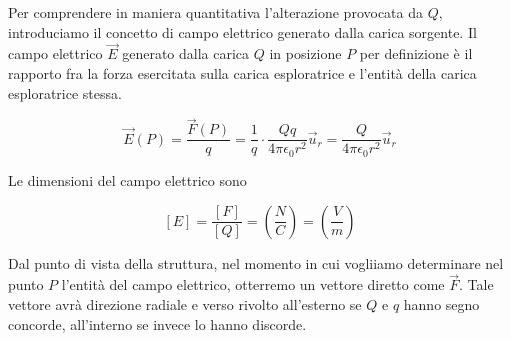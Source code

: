 Per comprendere in maniera quantitativa l'alterazione provocata da $Q$, introduciamo il concetto di campo elettrico generato dalla carica sorgente.
Il campo elettrico $\vec{E} $ generato dalla carica $Q$ in posizione $P$ per definizione è il rapporto fra la forza esercitata sulla carica esploratrice e l'entità della carica esploratrice stessa.

\[
	\vec{E} (P)=\frac{\vec{F} (P)}{q}=\frac{1}{q}\cdot \frac{Qq}{4\pi \epsilon_0 r^2}\vec{u}_r = \frac{Q}{4\pi \epsilon_0 r^2}\vec{u}_r
\]

Le dimensioni del campo elettrico sono

\[
	[E]=\frac{[F]}{[Q]} = \left( \frac{N}{C} \right) = \left( \frac{V}{m} \right)
\]

Dal punto di vista della struttura, nel momento in cui vogliiamo determinare nel punto $P$ l'entità del campo elettrico, otterremo un vettore diretto come $\vec{F}$. Tale vettore avrà direzione radiale e verso rivolto all'esterno se $Q$ e $q$ hanno segno concorde, all'interno se invece lo hanno discorde.

